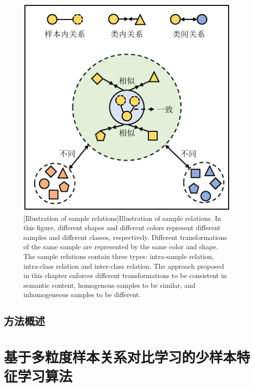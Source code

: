 \begin{figure}[h!]
\centering
{}
\includegraphics[width=0.6\columnwidth]{figures/MGSRCL/SampleRelation.pdf}
[Illustration of sample relations]{Illustration of sample relations. In this figure, different shapes and different colors represent different samples and different classes, respectively. Different transformations of the same sample are represented by the same color and shape. The sample relations contain three types: intra-sample relation, intra-class relation and inter-class relation. The approach proposed in this chapter enforces different transformations to be consistent in semantic content, homogenous samples to be similar, and inhomogeneous samples to be different.}
\label{figure3: sample relation}
\end{figure}

\subsection[\hspace{-2pt}方法概述]{{\heiti{} \hspace{-8pt}方法概述}}\label{section3: 方法概述}



\section[\hspace{-2pt}基于多粒度样本关系对比学习的少样本特征学习算法]{{\heiti{} \hspace{-8pt}基于多粒度样本关系对比学习的少样本特征学习算法}}\label{section3: 基于多粒度样本关系对比学习的少样本特征学习算法}

